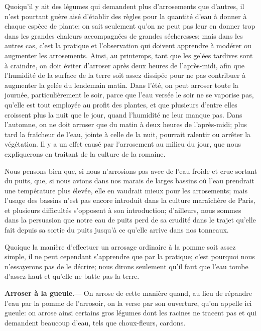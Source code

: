 \documentclass[10pt,a4paper]{book}
\begin{document}
Quoiqu'il y ait des légumes qui demandent plus d'arrosements que d'autres, il n'est pourtant guère aisé d'établir des règles pour la quantité d'eau à donner à chaque espèce de plante; on sait seulement qu'on ne peut pas leur en donner trop dans les grandes chaleurs accompagnées de grandes sécheresses; mais dans les autres cas, c'est la pratique et l'observation qui doivent apprendre à modérer ou augmenter les arrosements. Ainsi, au printemps, tant que les gelées tardives sont à craindre, on doit éviter d'arroser après deux heures de l'après-midi, afin que l'humidité de la surface de la terre soit assez dissipée pour ne pas contribuer à augmenter la gelée du lendemain matin. Dans l'été, on peut arroser toute la journée, particulièrement le soir, parce que l'eau versée le soir ne se vaporise pas, qu'elle est tout employée au profit des plantes, et que plusieurs d'entre elles croissent plus la nuit que le jour, quand l'humidité ne leur manque pas. Dans l'automne, on ne doit arroser que du matin à deux heures de l'après-midi; plus tard la fraîcheur de l'eau, jointe à celle de la nuit, pourrait ralentir ou arrêter la végétation. Il y a un effet causé par l'arrosement au milieu du jour, que nous expliquerons en traitant de la culture de la romaine.

Nous pensons bien que, si nous n'arrosions pas avec de l'eau froide et crue sortant du puits, que, si nous avions dans nos marais de larges bassins où l'eau prendrait une température plus élevée, elle en vaudrait mieux pour les arrosements; mais l'usage des bassins n'est pas encore introduit dans la culture maraîchère de Paris, et plusieurs difficultés s'opposent à son introduction; d'ailleurs, nous sommes dans la persuasion que notre eau de puits perd de sa crudité dans le trajet qu'elle fait depuis sa sortie du puits jusqu'à ce qu'elle arrive dans nos tonneaux.

Quoique la manière d'effectuer un arrosage ordinaire à la pomme soit assez simple, il ne peut cependant s'apprendre que par la pratique; c'est pourquoi nous n'essayerons pas de le décrire; nous dirons seulement qu'il faut que l'eau tombe d'assez haut et qu'elle ne batte pas la terre.

\textbf{Arroser à la gueule}.--- On arrose de cette manière quand, au lieu de répandre l'eau par la pomme de l'arrosoir, on la verse par son ouverture, qu'on appelle ici gueule: on arrose ainsi certains gros légumes dont les racines ne tracent pas et qui demandent beaucoup d'eau, tels que choux-fleurs, cardons.
\end{document}
